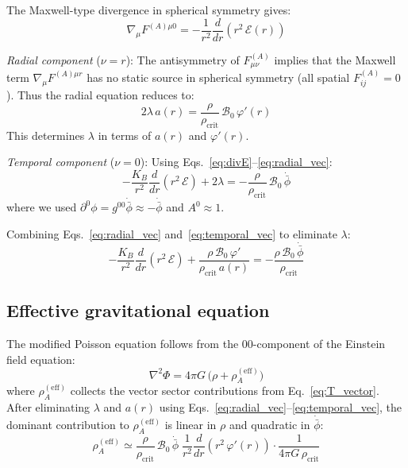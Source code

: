 \documentclass[aps,prd,twocolumn,superscriptaddress,nofootinbib]{revtex4-2}
\begin{document}
The Maxwell-type divergence in spherical symmetry gives:
\begin{equation}
\nabla_\mu F^{(A)\mu 0} = -\frac{1}{r^2}\frac{d}{dr}\!\left(r^2\,\mathcal{E}(r)\right)
\label{eq:divE}
\end{equation}

\textit{Radial component} ($\nu = r$): The antisymmetry of $F^{(A)}_{\mu\nu}$ implies that the Maxwell term $\nabla_\mu F^{(A)\mu r}$ has no static source in spherical symmetry (all spatial $F^{(A)}_{ij} = 0$). Thus the radial equation reduces to:
\begin{equation}
2\lambda\,a(r) = \frac{\rho}{\rho_{\mathrm{crit}}}\,\mathcal{B}_0\,\varphi'(r)
\label{eq:radial_vec}
\end{equation}
This determines $\lambda$ in terms of $a(r)$ and $\varphi'(r)$.

\textit{Temporal component} ($\nu = 0$): Using Eqs.~\eqref{eq:divE}--\eqref{eq:radial_vec}:
\begin{equation}
-\frac{K_B}{r^2}\frac{d}{dr}\!\left(r^2\,\mathcal{E}\right) + 2\lambda = -\frac{\rho}{\rho_{\mathrm{crit}}}\,\mathcal{B}_0\,\dot{\bar{\phi}}
\label{eq:temporal_vec}
\end{equation}
where we used $\partial^0\phi = g^{00}\dot{\bar{\phi}} \approx -\dot{\bar{\phi}}$ and $A^0 \approx 1$.

Combining Eqs.~\eqref{eq:radial_vec} and~\eqref{eq:temporal_vec} to eliminate $\lambda$:
\begin{equation}
-\frac{K_B}{r^2}\frac{d}{dr}\!\left(r^2\,\mathcal{E}\right) + \frac{\rho\,\mathcal{B}_0\,\varphi'}{\rho_{\mathrm{crit}}\,a(r)} = -\frac{\rho\,\mathcal{B}_0\,\dot{\bar{\phi}}}{\rho_{\mathrm{crit}}}
\label{eq:combined_vec}
\end{equation}

\subsection{Effective gravitational equation}
\label{sec:mod_poisson}

The modified Poisson equation follows from the $00$-component of the Einstein field equation:
\begin{equation}
\nabla^2\Phi = 4\pi G\,\bigl(\rho + \rho^{(\mathrm{eff})}_A\bigr)
\label{eq:mod_poisson}
\end{equation}
where $\rho^{(\mathrm{eff})}_A$ collects the vector sector contributions from Eq.~\eqref{eq:T_vector}. After eliminating $\lambda$ and $a(r)$ using Eqs.~\eqref{eq:radial_vec}--\eqref{eq:temporal_vec}, the dominant contribution to $\rho^{(\mathrm{eff})}_A$ is linear in $\rho$ and quadratic in $\dot{\bar{\phi}}$:
\begin{equation}
\rho^{(\mathrm{eff})}_A \simeq \frac{\rho}{\rho_{\mathrm{crit}}}\,\mathcal{B}_0\,\dot{\bar{\phi}}\;\frac{1}{r^2}\frac{d}{dr}\!\left(r^2\,\varphi'(r)\right) \cdot \frac{1}{4\pi G\,\rho_{\mathrm{crit}}}
\label{eq:rho_eff}
\end{equation}
\end{document}
